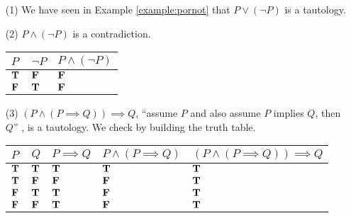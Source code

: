 \begin{example}\label{example:tautcontr}\hfill
\begin{itemize}[itemsep=1em]
\item[(1)] We have seen in Example \ref{example:pornot} that $P \vee (\neg P)$ is a tautology.

\item[(2)] $P \wedge (\neg P)$ is a contradiction.
\begin{center}
{\renewcommand{\arraystretch}{1.5}%
\begin{tabular}{|>{\centering}m{1cm}|>{\centering}m{1cm}|>{\centering\arraybackslash}m{2cm}|}
\hline
\rowcolor{lightgrey}
$P$ & $\neg P$ & $P\wedge (\neg P)$\\
\hline
$\mathbf{T}$ & $\mathbf{F}$ & $\mathbf{F}$\\
\hline
$\mathbf{F}$ & $\mathbf{T}$ & $\mathbf{F}$\\
\hline
\end{tabular}
}
\end{center}

\item[(3)] $(P \wedge (P \implies Q)) \implies Q$, ``assume $P$ and also assume $P$ implies $Q$, then $Q$'' , is a tautology. We check by building the truth table.
\begin{center}
{\renewcommand{\arraystretch}{1.5}%
\begin{tabular}{|>{\centering}m{1cm}|>{\centering}m{1cm}|>{\centering}m{1.5cm}|>{\centering}m{2.5cm}|>{\centering\arraybackslash}m{3.75cm}|}
\hline
\rowcolor{lightgrey}
$P$ & $Q$ & $P \implies Q$ & $P \wedge (P \implies Q)$ & $(P \wedge (P \implies Q)) \implies Q$\\
\hline
$\mathbf{T}$ & $\mathbf{T}$ & $\mathbf{T}$ & $\mathbf{T}$ & $\mathbf{T}$\\
\hline
$\mathbf{T}$ & $\mathbf{F}$ & $\mathbf{F}$ & $\mathbf{F}$ & $\mathbf{T}$\\
\hline
$\mathbf{F}$ & $\mathbf{T}$ & $\mathbf{T}$ & $\mathbf{F}$ & $\mathbf{T}$\\
\hline
$\mathbf{F}$ & $\mathbf{F}$ & $\mathbf{T}$ & $\mathbf{F}$ & $\mathbf{T}$\\
\hline
\end{tabular}
}
\end{center}


\end{itemize}
\end{example}
